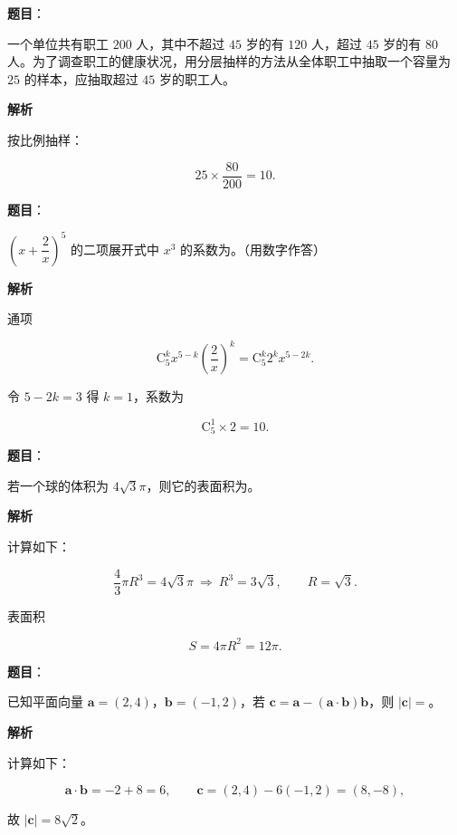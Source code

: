 \begin{answer}

\textbf{题目}：

一个单位共有职工 $200$ 人，其中不超过 $45$ 岁的有 $120$ 人，超过 $45$ 岁的有 $80$ 人。为了调查职工的健康状况，用分层抽样的方法从全体职工中抽取一个容量为 $25$ 的样本，应抽取超过 $45$ 岁的职工\gkblank{}人。

\textbf{解析}

按比例抽样：

\nopagebreak[4]
\[25\times\frac{80}{200}=10.\]


\end{answer}
\begin{answer}

\textbf{题目}：

$\left(x+\dfrac2x\right)^5$ 的二项展开式中 $x^3$ 的系数为\gkblank{}。（用数字作答）

\textbf{解析}

通项

\nopagebreak[4]
\[\mathrm C_5^kx^{5-k}\left(\frac2x\right)^k=\mathrm C_5^k2^kx^{5-2k}.\]

令 $5-2k=3$ 得 $k=1$，系数为

\nopagebreak[4]
\[\mathrm C_5^1\times2=10.\]


\end{answer}
\begin{answer}

\textbf{题目}：

若一个球的体积为 $4\sqrt3\pi$，则它的表面积为\gkblank{}。

\textbf{解析}

计算如下：

\nopagebreak[4]
\[\frac43\pi R^3=4\sqrt3\pi\ \Longrightarrow\ R^3=3\sqrt3,\qquad R=\sqrt3.\]

表面积

\nopagebreak[4]
\[S=4\pi R^2=12\pi.\]


\end{answer}
\begin{answer}

\textbf{题目}：

已知平面向量 $\boldsymbol a=(2,4)$，$\boldsymbol b=(-1,2)$，若 $\boldsymbol c=\boldsymbol a-(\boldsymbol a\cdot\boldsymbol b)\boldsymbol b$，则 $|\boldsymbol c|=$\gkblank{}。

\textbf{解析}

计算如下：

\nopagebreak[4]
\[\boldsymbol a\cdot\boldsymbol b=-2+8=6,\qquad \boldsymbol c=(2,4)-6(-1,2)=(8,-8),\]

故 $|\boldsymbol c|=8\sqrt2$。


\end{answer}
